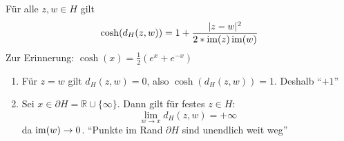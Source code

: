 \documentclass[../main.tex]{subfiles}
\begin{document}
\begin{proposition}
    Für alle $z,w \in H$ gilt 
    $$\cosh (d_H(z,w))=1 + \frac{|z-w|^2}{2 * \operatorname{im} (z) \operatorname{im}(w)}$$
    Zur Erinnerung: $\cosh (x)=\frac{1}{2}(e^x + e^{-x})$
\end{proposition}
\begin{remarks}
    \leavevmode
    \begin{enumerate}
        \item Für $z=w$ gilt $d_H (z,w)=0$, also $\cosh(d_H(z,w))=1$. Deshalb ``$+1$''
        \item Sei $x\in \partial H = \mathbb{R} \cup \{\infty\}$. Dann gilt für festes $z\in H$:
            $$\lim_{w \to x} d_H(z,w) = + \infty$$ da $\operatorname{im}(w)\to 0$.
            ``Punkte im Rand $\partial H$ sind unendlich weit weg''
    \end{enumerate}
\end{remarks}
\end{document}
